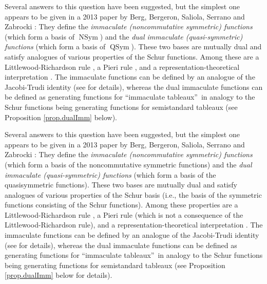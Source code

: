 \documentclass
[numbers=enddot,12pt,final,onecolumn,notitlepage,abstracton]{scrartcl}%
\theoremstyle{definition}
\newenvironment{verlong}{}{}
\newenvironment{vershort}{}{}
\begin{document}
\begin{vershort}
Several answers to this question have been suggested, but the simplest one
appears to be given in a 2013 paper by Berg, Bergeron, Saliola, Serrano and
Zabrocki \cite{BBSSZ}: They define the \textit{immaculate (noncommutative
symmetric) functions} (which form a basis of $\operatorname*{NSym}$) and the
\textit{dual immaculate (quasi-symmetric) functions} (which form a basis of
$\operatorname*{QSym}$). These two bases are mutually dual and satisfy
analogues of various properties of the Schur functions. Among these are a
Littlewood-Richardson rule \cite{BBSSZ14}, a Pieri rule \cite{BSOZ13}, and a
representation-theoretical interpretation \cite{BBSSZ13c}. The immaculate
functions can be defined by an analogue of the Jacobi-Trudi identity (see
\cite[Remark 3.28]{BBSSZ} for details), whereas the dual immaculate functions
can be defined as generating functions for \textquotedblleft immaculate
tableaux\textquotedblright\ in analogy to the Schur functions being generating
functions for semistandard tableaux (see Proposition \ref{prop.dualImm} below).
\end{vershort}

\begin{verlong}
Several answers to this question have been suggested, but the simplest one
appears to be given in a 2013 paper by Berg, Bergeron, Saliola, Serrano and
Zabrocki \cite{BBSSZ}: They define the \textit{immaculate (noncommutative
symmetric) functions} (which form a basis of the noncommutative symmetric
functions) and the \textit{dual immaculate (quasi-symmetric) functions} (which
form a basis of the quasisymmetric functions). These two bases are mutually
dual and satisfy analogues of various properties of the Schur basis (i.e., the
basis of the symmetric functions consisting of the Schur functions). Among
these properties are a Littlewood-Richardson rule \cite{BBSSZ14}, a Pieri rule
\cite{BSOZ13} (which is not a consequence of the Littlewood-Richardson rule),
and a representation-theoretical interpretation \cite{BBSSZ13c}. The
immaculate functions can be defined by an analogue of the Jacobi-Trudi
identity (see \cite[Remark 3.28]{BBSSZ} for details), whereas the dual
immaculate functions can be defined as generating functions for
\textquotedblleft immaculate tableaux\textquotedblright\ in analogy to the
Schur functions being generating functions for semistandard tableaux (see
Proposition \ref{prop.dualImm} below for details).
\end{verlong}
\end{document}

